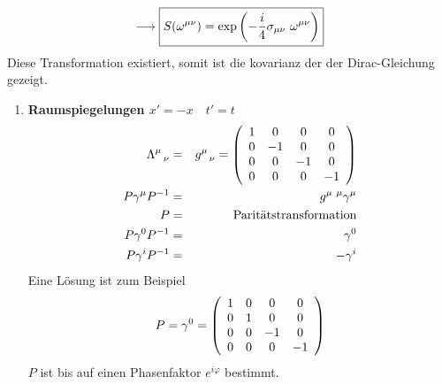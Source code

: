 \begin{eqnarray*} \longrightarrow \boxed{S(\omega^{\mu\nu}) = \exp\left(-\frac i 4 \sigma_{\mu\nu} \ \omega^{\mu\nu}\right)}
\end{eqnarray*}
Diese Transformation existiert, somit ist die kovarianz der der Dirac-Gleichung gezeigt.

\begin{enumerate}
\item {\bf Raumspiegelungen $x' = -x \quad t' = t$}
\begin{eqnarray*} \Lambda^{\mu}_{\ \ \nu} &=& g^{\mu}_{\ \ \nu} = \left ( \begin{array}{cccc} 1&0&0&0\\0&-1&0&0\\0&0&-1&0\\0&0&0&-1\end{array}\right)\\
P\gamma^{\mu} P^{-1} &=& g^{\mu \ \mu}\gamma^{\mu}\\
P &=&\text{Paritätstransformation}\\
P\gamma^0 P^{-1} &=& \gamma^0 \\
P  \gamma^ i P^{-1} &=&-\gamma^i
\end{eqnarray*}
Eine Lösung ist zum Beispiel
\begin{eqnarray*} P = \gamma^0 = \left ( \begin{array}{cccc} 1&0&0&0\\0&1&0&0\\0&0&-1&0\\0&0&0&-1\end{array}\right)\end{eqnarray*}
$P$ ist bis auf einen Phasenfaktor $ e^{i\varphi}$ bestimmt.


\end{enumerate}
